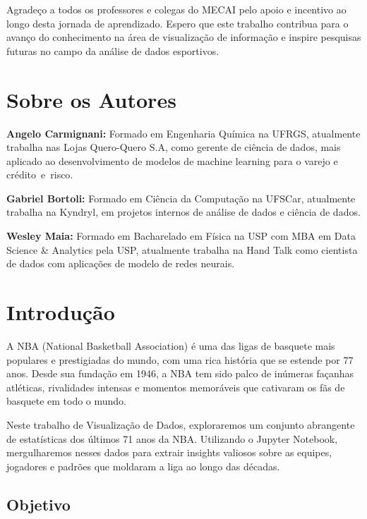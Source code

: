 \documentclass[
]{book}
\begin{document}
Agradeço a todos os professores e colegas do MECAI pelo apoio e incentivo ao longo desta jornada de aprendizado. Espero que este trabalho contribua para o avanço do conhecimento na área de visualização de informação e inspire pesquisas futuras no campo da análise de dados esportivos.

\hypertarget{author}{%
\chapter*{Sobre os Autores}\label{author}}

\textbf{Angelo Carmignani:} Formado em Engenharia Química na UFRGS, atualmente trabalha nas Lojas Quero-Quero S.A, como gerente de ciência de dados, mais aplicado ao desenvolvimento de modelos de machine learning para o varejo e crédito~e~risco.

\textbf{Gabriel Bortoli:} Formado em Ciência da Computação na UFSCar, atualmente trabalha na Kyndryl, em projetos internos de análise de dados e ciência de dados.

\textbf{Wesley Maia:} Formado em Bacharelado em Física na USP com MBA em Data Science \& Analytics pela USP, atualmente trabalha na Hand Talk como cientista de dados com aplicações de modelo de redes neurais.

\hypertarget{introduuxe7uxe3o}{%
\chapter{Introdução}\label{introduuxe7uxe3o}}

A NBA (National Basketball Association) é uma das ligas de basquete mais populares e prestigiadas do mundo, com uma rica história que se estende por 77 anos. Desde sua fundação em 1946, a NBA tem sido palco de inúmeras façanhas atléticas, rivalidades intensas e momentos memoráveis que cativaram os fãs de basquete em todo o mundo.

Neste trabalho de Visualização de Dados, exploraremos um conjunto abrangente de estatísticas dos últimos 71 anos da NBA. Utilizando o Jupyter Notebook, mergulharemos nesses dados para extrair insights valiosos sobre as equipes, jogadores e padrões que moldaram a liga ao longo das décadas.

\hypertarget{objetivo}{%
\section{Objetivo}\label{objetivo}}
\end{document}
